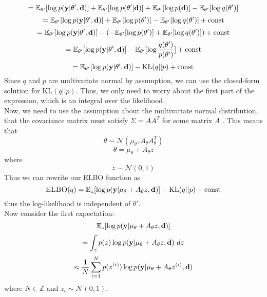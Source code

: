$$ = \mathbb{E}_{\theta'}[\log p(\mathbf{y} | \theta', \mathbf{d})] + \mathbb{E}_{\theta'}[\log p(\theta' | \mathbf{d})] + \mathbb{E}_{\theta'}[\log p(\mathbf{d})] - \mathbb{E}_{\theta'}[\log q(\theta')]$$
$$ = \mathbb{E}_{\theta'}[\log p(\mathbf{y} | \theta', \mathbf{d})] + \mathbb{E}_{\theta'}[\log p(\theta')] - \mathbb{E}_{\theta'}[\log q(\theta')] + \textrm{const}$$
$$ = \mathbb{E}_{\theta'}[\log p(\mathbf{y} | \theta', \mathbf{d})] - (-\mathbb{E}_{\theta'}[\log p(\theta')] + \mathbb{E}_{\theta'}[\log q(\theta')]) + \textrm{const}$$
$$ = \mathbb{E}_{\theta'}[\log p(\mathbf{y} | \theta', \mathbf{d})] - \mathbb{E}_{\theta'}[\log \frac{q(\theta')}{p(\theta')}] + \textrm{const}$$
$$ = \mathbb{E}_{\theta'}[\log p(\mathbf{y} | \theta', \mathbf{d})] - \textrm{KL}(q || p) + \textrm{const}$$
Since $q$ and $p$ are multivariate normal by assumption, we can use the closed-form solution for $\textrm{KL}(q || p)$. 
Thus, we only need to worry about the first part of the expression, which is an integral over the likelihood.\\
Now, we need to use the assumption about the multivariate normal distribution, that the covariance matrix must satisfy $\Sigma = AA^T$ for some matrix $A$ .
This means that
$$\theta \sim \mathcal{N}(\mu_\theta, A_\theta A_\theta^T)$$
$$\theta = \mu_\theta + A_\theta z$$
where
$$z \sim \mathcal{N}(0, 1)$$
Thus we can rewrite our ELBO function as
$$\textsc{ELBO}(q) = \mathbb{E}_{z}[\log p(\mathbf{y} | \mu_\theta + A_\theta z, \mathbf{d})] - \textrm{KL}(q || p) + \textrm{const}$$
thus the log-likelihood is independent of $\theta'$.\\
Now consider the first expectation:
$$\mathbb{E}_{z}[\log p(\mathbf{y} | \mu_\theta + A_\theta z, \mathbf{d})]$$
$$=\int_{z}p(z) \log p(\mathbf{y} | \mu_\theta + A_\theta z, \mathbf{d})\ dz$$
$$\approx \frac{1}{N}\sum_{i=1}^N p(z^{(i)})\log p(\mathbf{y} | \mu_\theta + A_\theta z^{(i)}, \mathbf{d})$$
where $N \in \mathbb{Z}$ and $z_i \sim \mathcal{N}(0, 1)$.
